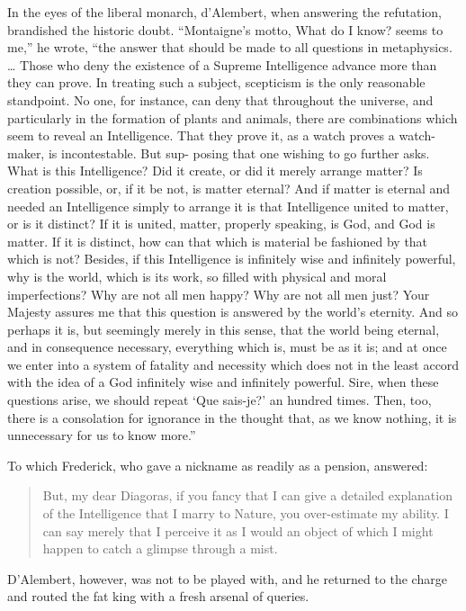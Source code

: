 \documentclass[]{book}
\begin{document}
In the eyes of the liberal monarch, d'Alembert, when answering the
refutation, brandished the historic doubt. ``Montaigne's motto, What do
I know? seems to me,'' he wrote, ``the answer that should be made to all
questions in metaphysics. \ldots{} Those who deny the existence of a
Supreme Intelligence advance more than they can prove. In treating such
a subject, scepticism is the only reasonable standpoint. No one, for
instance, can deny that throughout the universe, and particularly in the
formation of plants and animals, there are combinations which seem to
reveal an Intelligence. That they prove it, as a watch proves a
watch-maker, is incontestable. But sup- posing that one wishing to go
further asks. What is this Intelligence? Did it create, or did it merely
arrange matter? Is creation possible, or, if it be not, is matter
eternal? And if matter is eternal and needed an Intelligence simply to
arrange it is that Intelligence united to matter, or is it distinct? If
it is united, matter, properly speaking, is God, and God is matter. If
it is distinct, how can that which is material be fashioned by that
which is not? Besides, if this Intelligence is infinitely wise and
infinitely powerful, why is the world, which is its work, so filled with
physical and moral imperfections? Why are not all men happy? Why are not
all men just? Your Majesty assures me that this question is answered by
the world's eternity. And so perhaps it is, but seemingly merely in this
sense, that the world being eternal, and in consequence necessary,
everything which is, must be as it is; and at once we enter into a
system of fatality and necessity which does not in the least accord with
the idea of a God infinitely wise and infinitely powerful. Sire, when
these questions arise, we should repeat `Que sais-je?' an hundred times.
Then, too, there is a consolation for ignorance in the thought that, as
we know nothing, it is unnecessary for us to know more.''

To which Frederick, who gave a nickname as readily as a pension,
answered:

\begin{quote}
But, my dear Diagoras, if you fancy that I can give a detailed
explanation of the Intelligence that I marry to Nature, you
over-estimate my ability. I can say merely that I perceive it as I would
an object of which I might happen to catch a glimpse through a mist.
\end{quote}

D'Alembert, however, was not to be played with, and he returned to the
charge and routed the fat king with a fresh arsenal of queries.
\end{document}
